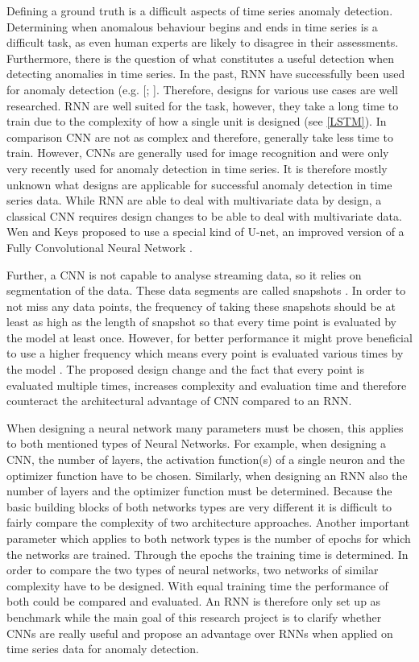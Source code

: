 Defining a ground truth is a difficult aspects of time series anomaly detection. Determining when anomalous behaviour begins and ends in time series is a difficult task, as even human experts are likely to disagree in their assessments. Furthermore, there is the question of what constitutes a useful detection when detecting anomalies in time series.
In the past, RNN have successfully been used for anomaly detection (e.g. [\parencite{Malhotra2015}; \parencite{Fan2016}]. Therefore, designs for various use cases are well researched. RNN are well suited for the task, however, they take a long time to train due to the complexity of how a single unit is designed (see \ref{LSTM}). In comparison CNN are not as complex and therefore, generally take less time to train. However, CNNs are generally used for image recognition and were only very recently used for anomaly detection in time series. It is therefore mostly unknown what designs are applicable for successful anomaly detection in time series data. %
While RNN are able to deal with multivariate data by design, a classical CNN requires design changes to be able to deal with multivariate data. Wen and Keys \parencite*{Wen2019} proposed to use a special kind of U-net, an improved version of a Fully Convolutional Neural Network \parencite{Ronneberger2015}.

Further, a CNN is not capable to analyse streaming data, so it relies on segmentation of the data. These data segments are called snapshots \parencite{Wen2019}. In order to not miss any data points, the frequency of taking these snapshots should be at least as high as the length of snapshot so that every time point is evaluated by the model at least once. However, for better performance it might prove beneficial to use a higher frequency which means every point is evaluated various times by the model \parencite{Wen2019}. The proposed design change and the fact that every point is evaluated multiple times, increases complexity and evaluation time and therefore counteract the architectural advantage of CNN compared to an RNN. 

When designing a neural network many parameters must be chosen, this applies to both mentioned types of Neural Networks. For example, when designing a CNN, the number of layers, the activation function(s) of a single neuron and the optimizer function have to be chosen. Similarly, when designing an RNN also the number of layers and the optimizer function must be determined. Because the basic building blocks of both networks types are very different it is difficult to fairly compare the complexity of two architecture approaches. Another important parameter which applies to both network types is the number of epochs for which the networks are trained. Through the epochs the training time is determined. In order to compare the two types of neural networks, two networks of similar complexity have to be designed. With equal training time the performance of both could be compared and evaluated. An RNN is therefore only set up as benchmark while the main goal of this research project is to clarify whether CNNs are really useful and propose an advantage over RNNs when applied on time series data for anomaly detection.



